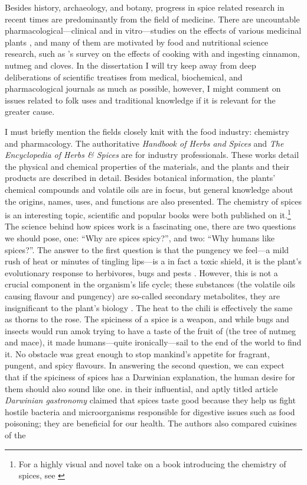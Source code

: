 Besides history, archaeology, and botany, progress in spice related research in recent times are predominantly from the field of medicine. There are uncountable pharmacological---clinical and in vitro---studies on the effects of various medicinal plants \autocite{boy_recommended_2018}, and many of them are motivated by food and nutritional science research, such as \textcite{baker_impact_2013}'s survey on the effects of cooking with and ingesting cinnamon, nutmeg and cloves. In the dissertation I will try keep away from deep deliberations of scientific treatises from medical, biochemical, and pharmacological journals as much as possible, however, I might  comment on issues related to folk uses and traditional knowledge if it is relevant for the greater cause.

I must briefly mention the fields closely knit with the food industry: chemistry and pharmacology. The authoritative \textit{Handbook of Herbs and Spices} \autocite{peter_handbook_2012} and \textit{The Encyclopedia of Herbs \& Spices} \autocite{ravindran_encyclopedia_2017} are for industry professionals. These works detail the physical and chemical properties of the materials, and the plants and their products are described in detail. Besides botanical information, the plants' chemical compounds and volatile oils are in focus, but general knowledge about the origins, names, uses, and functions are also presented. The chemistry of spices is an interesting topic, scientific and popular books were both published on it.\footnote{For a highly visual and novel take on a book introducing the chemistry of spices, see \textcite{farrimond_science_2018}} The science behind how spices work is a fascinating one, there are two questions we should pose, one: ``Why are spices spicy?'', and two: ``Why humans like spices?''. The answer to the first question is that the pungency we feel---a mild rush of heat or minutes of tingling lips---is a in fact a toxic shield, it is the plant's evolutionary response to herbivores, bugs and pests \autocite[21]{turner_spice_2004}. However, this is not a crucial component in the organism's life cycle; these substances (the volatile oils causing flavour and pungency) are so-called secondary metabolites, they are insignificant to the plant's biology \autocite[18]{parthasarathy_chemistry_2008}. The heat to the chili is effectively the same as thorns to the rose. The spiciness of a spice is a weapon, and while bugs and insects would run amok trying to have a taste of the fruit of  (the tree of nutmeg and mace), it made humans---quite ironically---sail to the end of the world to find it. No obstacle was great enough to stop mankind's appetite for fragrant, pungent, and spicy flavours. In answering the second question, we can expect that if the spiciness of spices has a Darwinian explanation, the human desire for them should also sound like one. \textcite{sherman_darwinian_1999} in their influential, and aptly titled article \textit{Darwinian gastronomy} claimed that spices taste good because they help us fight hostile bacteria and microorganisms responsible for digestive issues such as food poisoning; they are beneficial for our health. The authors also compared cuisines of the 